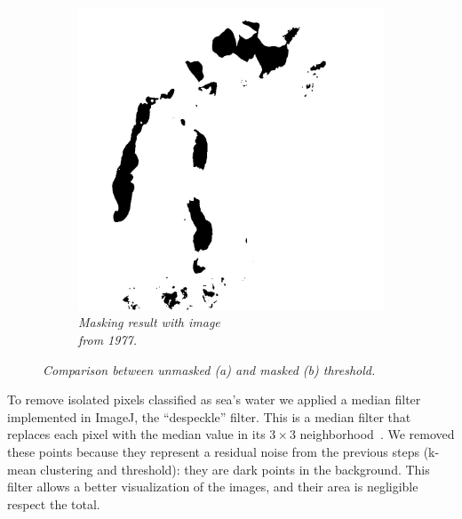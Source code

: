 \begin{figure}[H]
\begin{subfigure}[b]{.45\textwidth}
        \includegraphics[width=\textwidth]{../img/2015w.jpg}
        \caption{\emph{Masking result with image \\from 1977.}}
    \end{subfigure}
    \caption{\emph{Comparison between unmasked (a) and masked (b) threshold.}}
    \label{fig:masking}
\end{figure}
To remove isolated pixels classified as sea's water we applied a median filter implemented in ImageJ, the ``despeckle'' filter. 
This is a median filter that replaces each pixel with the median value in its $3 \times 3$ neighborhood~\cite{despeckle}.
We removed these points because they represent a residual noise from the previous steps (k-mean clustering and threshold): they are dark points in the background. 
This filter allows a better visualization of the images, and their area is negligible respect the total.

